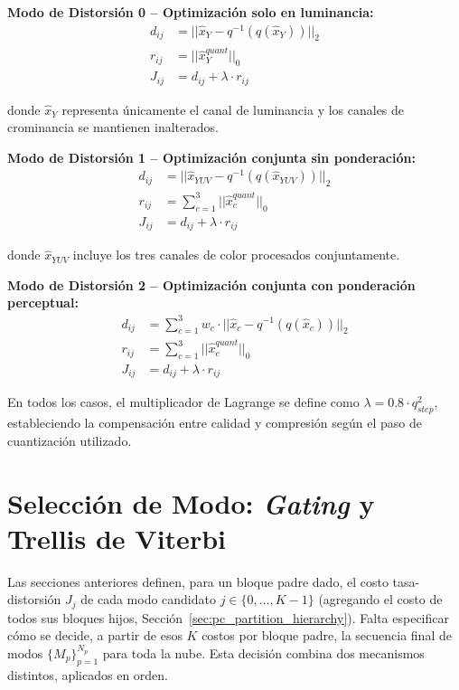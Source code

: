         \textbf{Modo de Distorsión 0 -- Optimización solo en luminancia:}
        \begin{align}
           d_{ij} &= ||\hat{x}_Y - q^{-1}(q(\hat{x}_Y))||_2 \\
           r_{ij} &= ||\hat{x}_Y^{quant}||_0 \\
           J_{ij} &= d_{ij} + \lambda \cdot r_{ij}
        \end{align}
        
        donde $\hat{x}_Y$ representa únicamente el canal de luminancia y los canales de crominancia se mantienen inalterados.
        
        \textbf{Modo de Distorsión 1 -- Optimización conjunta sin ponderación:}
        \begin{align}
           d_{ij} &= ||\hat{x}_{YUV} - q^{-1}(q(\hat{x}_{YUV}))||_2 \\
           r_{ij} &= \sum_{c=1}^{3} ||\hat{x}_{c}^{quant}||_0 \\
           J_{ij} &= d_{ij} + \lambda \cdot r_{ij}
        \end{align}
        
        donde $\hat{x}_{YUV}$ incluye los tres canales de color procesados conjuntamente.
        
        \textbf{Modo de Distorsión 2 -- Optimización conjunta con ponderación perceptual:}
        \begin{align}
           d_{ij} &= \sum_{c=1}^{3} w_c \cdot ||\hat{x}_c - q^{-1}(q(\hat{x}_c))||_2 \\
           r_{ij} &= \sum_{c=1}^{3} ||\hat{x}_{c}^{quant}||_0 \\
           J_{ij} &= d_{ij} + \lambda \cdot r_{ij}
        \end{align}
        
        En todos los casos, el multiplicador de Lagrange se define como $\lambda = 0.8 \cdot q_{step}^2$, estableciendo la compensación entre calidad y compresión según el paso de cuantización utilizado.

\section{Selección de Modo: \textit{Gating} y Trellis de Viterbi}\label{sec:mode_selection}

    Las secciones anteriores definen, para un bloque padre dado, el costo tasa-distorsión $J_j$
    de cada modo candidato $j \in \{0,\dots,K-1\}$ (agregando el costo de todos sus bloques
    hijos, Sección~\ref{sec:pc_partition_hierarchy}). Falta especificar cómo se decide, a partir
    de esos $K$ costos por bloque padre, la secuencia final de modos $\{M_p\}_{p=1}^{N_p}$ para
    toda la nube. Esta decisión combina dos mecanismos distintos, aplicados en orden.


